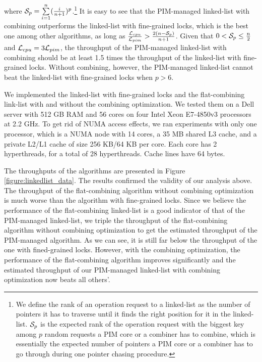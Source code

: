 where $\mathcal{S}_{p} = \sum\limits_{i=1}^{n} ({i \over n+1})^{p}$.\footnote{
We define the rank of an operation request to a linked-list as the number of pointers
it has to traverse until it finds the right position for it in the linked-list.
$\mathcal{S}_{p}$ is the expected rank of the operation request with the biggest key
among $p$ random requests a PIM core or a combiner has to combine,
which is essentially the expected number of pointers a PIM core or a combiner
has to go through during one pointer chasing procedure.} 
It is easy to see that the PIM-managed linked-list with combining outperforms 
the linked-list with fine-grained locks, which is the best one among other algorithms, 
as long as ${\mathcal{L}_{cpu} \over \mathcal{L}_{pim}} > {2(n - \mathcal{S}_{p})\over n + 1}$.
Given that $0 < \mathcal{S}_{p} \le {n \over 2}$ and $\mathcal{L}_{cpu} = 3\mathcal{L}_{pim}$,
the throughput of the PIM-managed linked-list with combining should be at least 
1.5 times the throughput of the linked-list with fine-grained locks.
Without combining, however, the PIM-managed linked-list cannot
beat the linked-list with fine-grained locks when $p > 6$.


We implemented the linked-list with fine-grained locks and the flat-combining link-list 
with and without the combining optimization.
We tested them on a Dell server with 512 GB RAM and 
56 cores on four Intel Xeon E7-4850v3 processors at 2.2 GHz.
To get rid of NUMA access effects, we ran experiments with only one processor, 
which is a NUMA node with 14 cores, a 35 MB shared L3 cache, 
and a private L2/L1 cache of size 256 KB/64 KB per core. 
Each core has 2 hyperthreads, for a total of 28 hyperthreads. 
Cache lines have 64 bytes.

The throughputs of the algorithms are presented in Figure \ref{figure:linkedlist_data}.
The results confirmed the validity of our analysis above.
The throughput of the flat-combining algorithm without combining optimization
is much worse than the algorithm with fine-grained locks.
Since we believe the performance of the flat-combining linked-list is a good 
indicator of that of the PIM-managed linked-list, we triple the throughput of the
flat-combining algorithm without combining optimization to get the estimated
throughput of the PIM-managed algorithm. 
As we can see, it is still far below the throughput of the one with fined-grained locks.
However, with the combining optimization, the performance of the flat-combining
algorithm improves significantly and the estimated throughput of our PIM-managed
linked-list with combining optimization now beats all others'.

